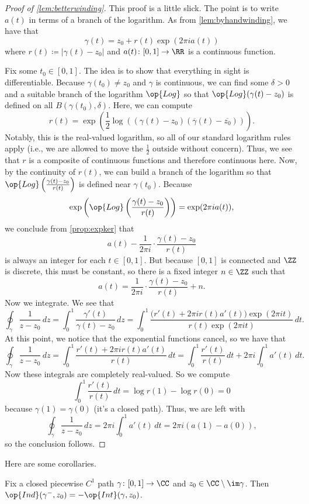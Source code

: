 \begin{proof}[Proof of \autoref{lem:betterwinding}]
	This proof is a little slick. The point is to write $a(t)$ in terms of a branch of the logarithm. As from \autoref{lem:byhandwinding}, we have that
	\[\gamma(t)=z_0+r(t)\exp(2\pi ia(t))\]
	where $r(t)\coloneqq |\gamma(t)-z_0|$ and $a(t)\colon [0,1]\to\RR$ is a continuous function.

	Fix some $t_0\in[0,1]$. The idea is to show that everything in sight is differentiable. Because $\gamma(t_0)\ne z_0$ and $\gamma$ is continuous, we can find some $\delta>0$ and a suitable branch of the logarithm $\op{Log}$ so that $\op{Log}(\gamma(t)-z_0)$ is defined on all $B(\gamma(t_0),\delta)$. Here, we can compute
	\[r(t)=\exp\left(\frac12\log\left((\gamma(t)-z_0)(\overline\gamma(t)-\overline{z_0})\right)\right).\]
	Notably, this is the real-valued logarithm, so all of our standard logarithm rules apply (i.e., we are allowed to move the $\frac12$ outside without concern). Thus, we see that $r$ is a composite of continuous functions and therefore continuous here. Now, by the continuity of $r(t)$, we can build a branch of the logarithm so that $\op{Log}\left(\frac{\gamma(t)-z_0}{r(t)}\right)$ is defined near $\gamma(t_0)$. Because
	\[\exp\left(\op{Log}\left(\frac{\gamma(t)-z_0}{r(t)}\right)\right)=\exp(2\pi ia(t)),\]
	we conclude from \autoref{prop:expker} that
	\[a(t)-\frac1{2\pi i}\cdot\frac{\gamma(t)-z_0}{r(t)}\]
	is always an integer for each $t\in[0,1]$. But because $[0,1]$ is connected and $\ZZ$ is discrete, this must be constant, so there is a fixed integer $n\in\ZZ$ such that
	\[a(t)=\frac1{2\pi i}\cdot\frac{\gamma(t)-z_0}{r(t)}+n.\]
	Now we integrate. We see that
	\[\oint_\gamma\frac1{z-z_0}\,dz=\int_0^1\frac{\gamma'(t)}{\gamma(t)-z_0}\,dz=\int_0^1\frac{\big(r'(t)+2\pi ir(t)a'(t)\big)\exp(2\pi it)}{r(t)\exp(2\pi it)}\,dt.\]
	At this point, we notice that the exponential functions cancel, so we have that
	\[\oint_\gamma\frac1{z-z_0}\,dz=\int_0^1\frac{r'(t)+2\pi ir(t)a'(t)}{r(t)}\,dt=\int_0^1\frac{r'(t)}{r(t)}\,dt+2\pi i\int_0^1a'(t)\,dt.\]
	Now these integrals are completely real-valued. So we compute
	\[\int_0^1\frac{r'(t)}{r(t)}\,dt=\log r(1)-\log r(0)=0\]
	because $\gamma(1)=\gamma(0)$ (it's a closed path). Thus, we are left with
	\[\oint_\gamma\frac1{z-z_0}\,dz=2\pi i\int_0^1a'(t)\,dt=2\pi i(a(1)-a(0)),\]
	so the conclusion follows.
\end{proof}
Here are some corollaries.
\begin{corollary}
	Fix a closed piecewise $C^1$ path $\gamma\colon [0,1]\to\CC$ and $z_0\in\CC\setminus\im\gamma$. Then $\op{Ind}(\gamma^-,z_0)=-\op{Int}(\gamma,z_0)$.
\end{corollary}
